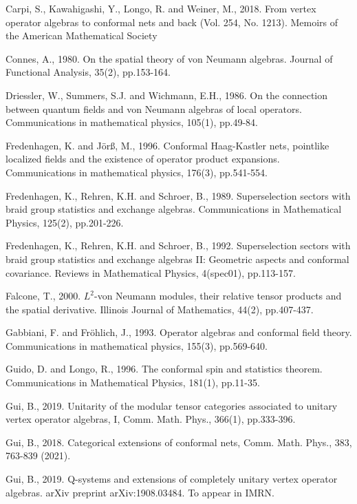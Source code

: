 \documentclass[12pt,a4paper]{article}
\theoremstyle{definition}
\theoremstyle{plain}
\numberwithin{equation}{section}
\begin{document}
\begin{thebibliography}{99999}
Carpi, S., Kawahigashi, Y., Longo, R. and Weiner, M., 2018. From vertex operator algebras to conformal nets and back (Vol. 254, No. 1213). Memoirs of the American Mathematical Society


Connes, A., 1980. On the spatial theory of von Neumann algebras. Journal of Functional Analysis, 35(2), pp.153-164.




Driessler, W., Summers, S.J. and Wichmann, E.H., 1986. On the connection between quantum fields and von Neumann algebras of local operators. Communications in mathematical physics, 105(1), pp.49-84.



Fredenhagen, K. and J\"or\ss, M., 1996. Conformal Haag-Kastler nets, pointlike localized fields and the existence of operator product expansions. Communications in mathematical physics, 176(3), pp.541-554.

Fredenhagen, K., Rehren, K.H. and Schroer, B., 1989. Superselection sectors with braid group statistics and exchange algebras. Communications in Mathematical Physics, 125(2), pp.201-226.

Fredenhagen, K., Rehren, K.H. and Schroer, B., 1992. Superselection sectors with braid group statistics and exchange algebras II: Geometric aspects and conformal covariance. Reviews in Mathematical Physics, 4(spec01), pp.113-157.

Falcone, T., 2000. $L^2$-von Neumann modules, their relative tensor products and the spatial derivative. Illinois Journal of Mathematics, 44(2), pp.407-437.

Gabbiani, F. and Fr\"ohlich, J., 1993. Operator algebras and conformal field theory. Communications in mathematical physics, 155(3), pp.569-640.

Guido, D. and Longo, R., 1996. The conformal spin and statistics theorem. Communications in Mathematical Physics, 181(1), pp.11-35.

Gui, B., 2019. Unitarity of the modular tensor categories associated to unitary vertex operator algebras, I,  Comm. Math. Phys., 366(1), pp.333-396. 

Gui, B., 2018. Categorical extensions of conformal nets, Comm. Math. Phys., 383, 763-839 (2021).

Gui, B., 2019. Q-systems and extensions of completely unitary vertex operator algebras. arXiv preprint arXiv:1908.03484. To appear in IMRN.


\end{thebibliography}
\end{document}
